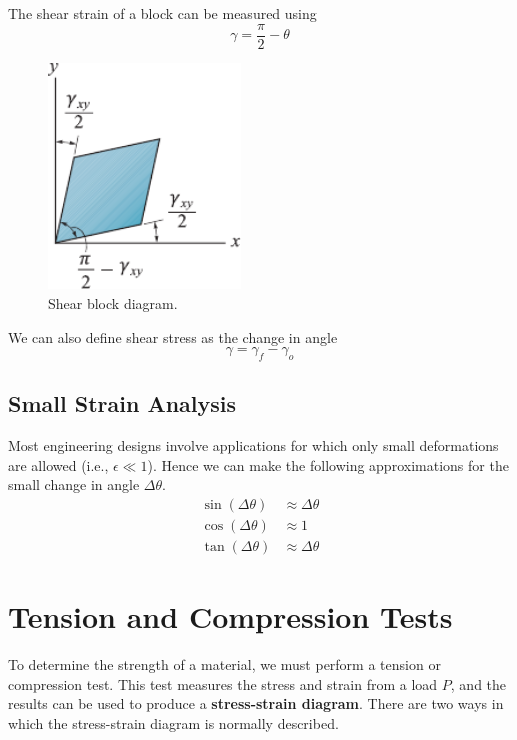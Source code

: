 \documentclass{article}
\begin{document}
The shear strain of a block can be measured using
\begin{equation*}
    \gamma = \frac{\pi}{2} - \theta
\end{equation*}
\begin{figure}[H]
    \centering
    \includegraphics[height = 6cm, keepaspectratio = true]{figures/shear_block.pdf}
    \caption{Shear block diagram.}
\end{figure}
We can also define shear stress as the change in angle
\begin{equation*}
    \gamma = \gamma_f - \gamma_o
\end{equation*}
\subsection{Small Strain Analysis}
Most engineering designs involve applications for which only small deformations are allowed
(i.e., \(\epsilon \ll 1\)).
Hence we can make the following approximations for the small change in angle \(\Delta{\theta}\).
\begin{align*}
    \sin{\left( \Delta{\theta} \right)} & \approx \Delta{\theta} \\
    \cos{\left( \Delta{\theta} \right)} & \approx 1              \\
    \tan{\left( \Delta{\theta} \right)} & \approx \Delta{\theta}
\end{align*}
\section{Tension and Compression Tests}
To determine the strength of a material, we must perform a tension or compression test.
This test measures the stress and strain from a load \(P\), and the results can be used to
produce a \textbf{stress-strain diagram}.
There are two ways in which the stress-strain diagram is normally described.
\end{document}
